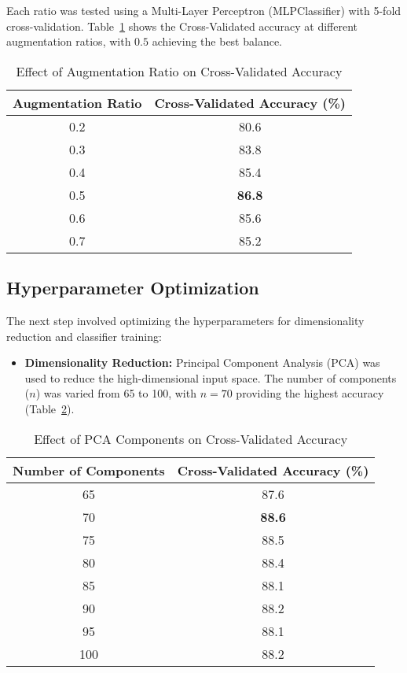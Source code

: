 \documentclass[a4paper]{article}
\begin{document}
Each ratio was tested using a Multi-Layer Perceptron (MLPClassifier) with 5-fold cross-validation. Table~\ref{tab:aug_results} shows the Cross-Validated accuracy at different augmentation ratios, with \(0.5\) achieving the best balance.

\begin{table}[h]
    \centering
    \caption{Effect of Augmentation Ratio on Cross-Validated Accuracy}
    \label{tab:aug_results}
    \begin{tabular}{cc}
        \hline
        \textbf{Augmentation Ratio} & \textbf{Cross-Validated Accuracy (\%)} \\
        \hline
        0.2 & 80.6 \\
        0.3 & 83.8 \\
        0.4 & 85.4 \\
        0.5 & \textbf{86.8} \\
        0.6 & 85.6 \\
        0.7 & 85.2 \\
        \hline
    \end{tabular}
\end{table}

\subsection{Hyperparameter Optimization}
The next step involved optimizing the hyperparameters for dimensionality reduction and classifier training:
\begin{itemize}
    \item \textbf{Dimensionality Reduction:} Principal Component Analysis (PCA) was used to reduce the high-dimensional input space. The number of components (\(n\)) was varied from 65 to 100, with \(n=70\) providing the highest accuracy (Table~\ref{tab:pca_results}).
\end{itemize}

\begin{table}[h]
    \centering
    \caption{Effect of PCA Components on Cross-Validated Accuracy}
    \label{tab:pca_results}
    \begin{tabular}{cc}
        \hline
        \textbf{Number of Components} & \textbf{Cross-Validated Accuracy (\%)} \\
        \hline
        65 & 87.6 \\
        70 & \textbf{88.6} \\
        75 & 88.5 \\
        80 & 88.4 \\
        85 & 88.1 \\
        90 & 88.2 \\
        95 & 88.1 \\
        100 & 88.2 \\
        \hline
    \end{tabular}
\end{table}
\end{document}
